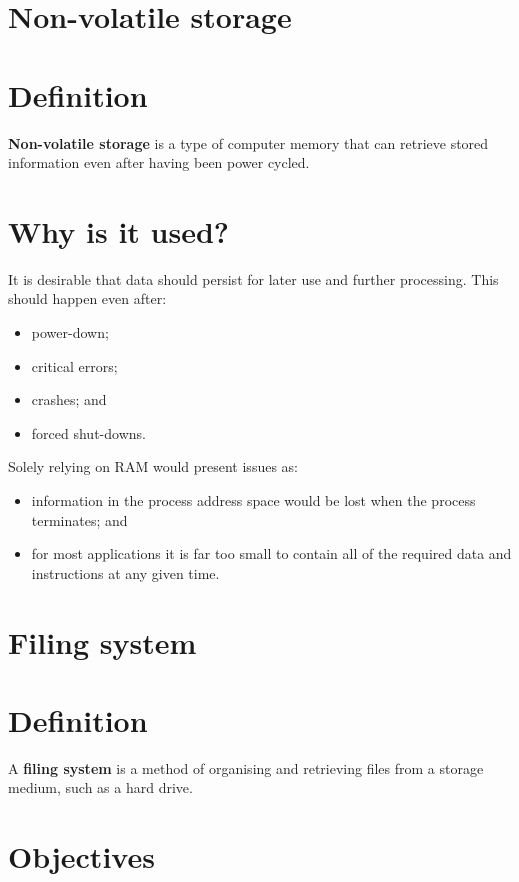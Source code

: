 \documentclass[a4paper]{systems-software}
\begin{document}
\section{Non-volatile storage}

\section*{Definition}

\textbf{Non-volatile storage} is a type of computer memory that can retrieve stored information even after having been power cycled.


\section*{Why is it used?}

It is desirable that data should persist for later use and further processing. This should happen even after:
\begin{itemize}
	\item power-down;
	\item critical errors;
	\item crashes; and
	\item forced shut-downs.
\end{itemize}

Solely relying on RAM would present issues as:
\begin{itemize}
	\item information in the process address space would be lost when the process terminates; and
	\item for most applications it is far too small to contain all of the required data and instructions at any given time.
\end{itemize}


\newpage

\section{Filing system}

\section*{Definition}

A \textbf{filing system} is a method of organising and retrieving files from a storage medium, such as a hard drive.


\section*{Objectives}
\end{document}
